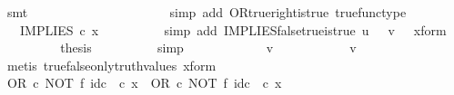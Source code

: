 \begin{isabellebody}
\ smt\isanewline
\ \ \ \ \ \ \isamarkupfalse%
\ \isamarkupfalse%
\ {\isachardoublequoteopen}{\isachardot}{\kern0pt}{\isachardot}{\kern0pt}{\isachardot}{\kern0pt}\ {\isacharequal}{\kern0pt}\ {\isasymt}{\isachardoublequoteclose}\isanewline
\ \ \ \ \ \ \ \ \isamarkupfalse%
\ {\isacharparenleft}{\kern0pt}simp\ add{\isacharcolon}{\kern0pt}\ OR{\isacharunderscore}{\kern0pt}true{\isacharunderscore}{\kern0pt}right{\isacharunderscore}{\kern0pt}is{\isacharunderscore}{\kern0pt}true\ true{\isacharunderscore}{\kern0pt}func{\isacharunderscore}{\kern0pt}type{\isacharparenright}{\kern0pt}\isanewline
\ \ \ \ \ \ \isamarkupfalse%
\ \isamarkupfalse%
\ {\isachardoublequoteopen}{\isachardot}{\kern0pt}{\isachardot}{\kern0pt}{\isachardot}{\kern0pt}\ {\isacharequal}{\kern0pt}\ IMPLIES\ {\isasymcirc}\isactrlsub c\ x{\isachardoublequoteclose}\isanewline
\ \ \ \ \ \ \ \ \isamarkupfalse%
\ {\isacharparenleft}{\kern0pt}simp\ add{\isacharcolon}{\kern0pt}\ IMPLIES{\isacharunderscore}{\kern0pt}false{\isacharunderscore}{\kern0pt}true{\isacharunderscore}{\kern0pt}is{\isacharunderscore}{\kern0pt}true\ {\isacartoucheopen}u\ {\isacharequal}{\kern0pt}\ {\isasymf}{\isacartoucheclose}\ {\isacartoucheopen}v\ {\isacharequal}{\kern0pt}\ {\isasymt}{\isacartoucheclose}\ x{\isacharunderscore}{\kern0pt}form{\isacharparenright}{\kern0pt}\isanewline
\ \ \ \ \ \ \isamarkupfalse%
\ \isamarkupfalse%
\ {\isacharquery}{\kern0pt}thesis\isanewline
\ \ \ \ \ \ \ \ \isamarkupfalse%
\ simp\isanewline
\ \ \ \ \isamarkupfalse%
\isanewline
\ \ \ \ \ \ \isamarkupfalse%
\ {\isachardoublequoteopen}v\ {\isasymnoteq}\ {\isasymt}{\isachardoublequoteclose}\isanewline
\ \ \ \ \ \ \isamarkupfalse%
\ \isamarkupfalse%
\ {\isachardoublequoteopen}v\ {\isacharequal}{\kern0pt}\ {\isasymf}{\isachardoublequoteclose}\isanewline
\ \ \ \ \ \ \ \ \isamarkupfalse%
\ {\isacharparenleft}{\kern0pt}metis\ true{\isacharunderscore}{\kern0pt}false{\isacharunderscore}{\kern0pt}only{\isacharunderscore}{\kern0pt}truth{\isacharunderscore}{\kern0pt}values\ x{\isacharunderscore}{\kern0pt}form{\isacharparenright}{\kern0pt}\isanewline
\ \ \ \ \ \ \isamarkupfalse%
\ {\isachardoublequoteopen}{\isacharparenleft}{\kern0pt}OR\ {\isasymcirc}\isactrlsub c\ NOT\ {\isasymtimes}\isactrlsub f\ id\isactrlsub c\ {\isasymOmega}{\isacharparenright}{\kern0pt}\ {\isasymcirc}\isactrlsub c\ x\ {\isacharequal}{\kern0pt}\ OR\ {\isasymcirc}\isactrlsub c\ {\isacharparenleft}{\kern0pt}NOT\ {\isasymtimes}\isactrlsub f\ id\isactrlsub c\ {\isasymOmega}{\isacharparenright}{\kern0pt}\ {\isasymcirc}\isactrlsub c\ x{\isachardoublequoteclose}\isanewline

\end{isabellebody}
